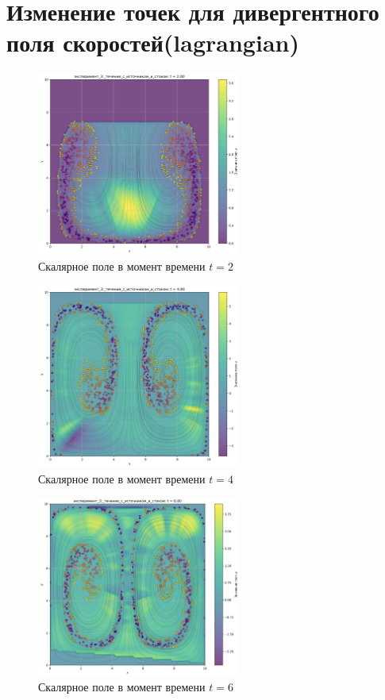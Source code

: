 \chapter{Изменение точек для дивергентного поля скоростей(lagrangian)}
\label{app:div_lg}

\begin{figure}[h]
	\centering
	\includegraphics[width=0.6\textwidth]{imgs/lg/эксперимент_3:_течение_с_источником_и_стоком_t2.00.png}
	\caption{Скалярное поле в момент времени $t=2$ }
\end{figure}
\begin{figure}[h]
	\centering
	\includegraphics[width=0.6\textwidth]{imgs/lg/эксперимент_3:_течение_с_источником_и_стоком_t4.00.png}
	\caption{Скалярное поле в момент времени $t=4$}
\end{figure}
\begin{figure}[h]
	\centering
	\includegraphics[width=0.6\textwidth]{imgs/lg/эксперимент_3:_течение_с_источником_и_стоком_t6.00.png}
	\caption{Скалярное поле в момент времени $t=6$ }
\end{figure}
